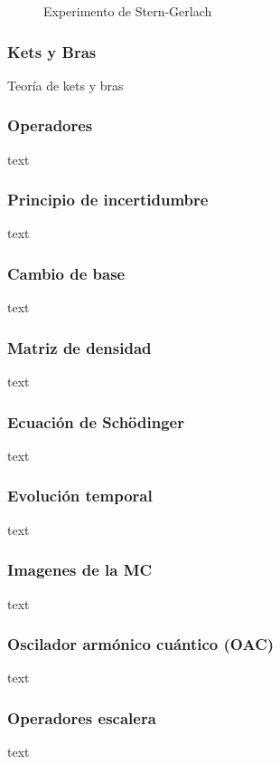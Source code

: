\documentclass[xcolor=dvipsnames,slidestop,compress,mathserif, 11pt]{beamer}
\begin{document}
\begin{frame}
\begin{figure}[h]
{
		}
		\caption{Experimento de Stern-Gerlach}
		\label{fig:stern-gerlach}
	\end{figure}

\end{frame}

\begin{frame}[c]
	\frametitle{Kets y Bras}
	Teoría de kets y bras
\end{frame}

\begin{frame}[c]
	\frametitle{Operadores}
	text
\end{frame}

\begin{frame}[c]
	\frametitle{Principio de incertidumbre}
	text
\end{frame}

\begin{frame}[c]
	\frametitle{Cambio de base}
	text
\end{frame}

\begin{frame}[c]
	\frametitle{Matriz de densidad}
	text
\end{frame}

\begin{frame}[c]
	\frametitle{Ecuación de Schödinger}
	text
\end{frame}

\begin{frame}[c]
	\frametitle{Evolución temporal}
	text
\end{frame}

\begin{frame}[c]
	\frametitle{Imagenes de la MC}
	text
\end{frame}

\begin{frame}[c]
	\frametitle{Oscilador armónico cuántico (OAC)}
	text
\end{frame}

\begin{frame}[c]
	\frametitle{Operadores escalera}
	text
\end{frame}
\end{document}
